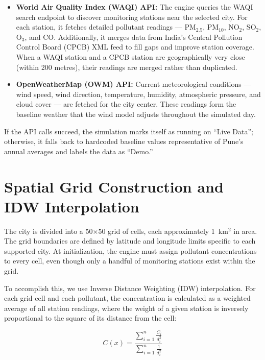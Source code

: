 \documentclass[a4paper, 12pt]{report}
\begin{document}
\begin{itemize}
\item \textbf{World Air Quality Index (WAQI) API:} The engine queries the WAQI search endpoint to discover monitoring stations near the selected city. For each station, it fetches detailed pollutant readings --- PM$_{2.5}$, PM$_{10}$, NO$_2$, SO$_2$, O$_3$, and CO. Additionally, it merges data from India's Central Pollution Control Board (CPCB) XML feed to fill gaps and improve station coverage. When a WAQI station and a CPCB station are geographically very close (within 200 metres), their readings are merged rather than duplicated.

\item \textbf{OpenWeatherMap (OWM) API:} Current meteorological conditions --- wind speed, wind direction, temperature, humidity, atmospheric pressure, and cloud cover --- are fetched for the city center. These readings form the baseline weather that the wind model adjusts throughout the simulated day.
\end{itemize}

If the API calls succeed, the simulation marks itself as running on ``Live Data''; otherwise, it falls back to hardcoded baseline values representative of Pune's annual averages and labels the data as ``Demo.''

\section{Spatial Grid Construction and IDW Interpolation}
The city is divided into a 50$\times$50 grid of cells, each approximately 1~km$^2$ in area. The grid boundaries are defined by latitude and longitude limits specific to each supported city. At initialization, the engine must assign pollutant concentrations to every cell, even though only a handful of monitoring stations exist within the grid.

To accomplish this, we use Inverse Distance Weighting (IDW) interpolation. For each grid cell and each pollutant, the concentration is calculated as a weighted average of all station readings, where the weight of a given station is inversely proportional to the square of its distance from the cell:

\begin{equation}
C(x) = \frac{\sum_{i=1}^{n} \frac{C_i}{d_i^2}}{\sum_{i=1}^{n} \frac{1}{d_i^2}}
\end{equation}
\end{document}
